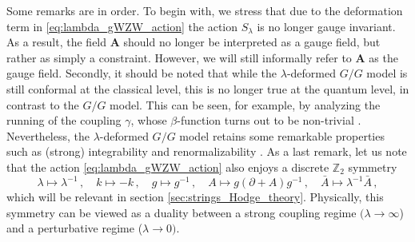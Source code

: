 \documentclass[11pt,a4paper]{article}
\numberwithin{equation}{section}
\numberwithin{table}{section}\setlength{\multlinegap}{25pt}
\begin{document}
Some remarks are in order. To begin with, we stress that due to the deformation term in \eqref{eq:lambda_gWZW_action} the action $S_\lambda$ is no longer gauge invariant. As a result, the field $\mathbf{A}$ should no longer be interpreted as a gauge field, but rather as simply a constraint. However, we will still informally refer to $\mathbf{A}$ as the gauge field. Secondly, it should be noted that while the $\lambda$-deformed $G/G$ model is still conformal at the classical level, this is no longer true at the quantum level, in contrast to the $G/G$ model. This can be seen, for example, by analyzing the running of the coupling $\gamma$, whose $\beta$-function turns out to be non-trivial \cite{Tseytlin:1994,Sfetsos:2014_betafunction,Appadu:2015}. Nevertheless, the $\lambda$-deformed $G/G$ model retains some remarkable properties such as (strong) integrability \cite{Hollowood:2014,Sfetsos:2014_integrability,Georgiou:2019} and renormalizability \cite{Hoare:2019}. As a last remark, let us note that the action \eqref{eq:lambda_gWZW_action} also enjoys a discrete $\mathbb{Z}_2$ symmetry \cite{Kutasov:1989,Itsios:2014,Hoare:2015}
\begin{equation}\label{eq:Z2_symmetry}
	\lambda\mapsto \lambda^{-1}\,,\quad k\mapsto -k\,,\quad g\mapsto g^{-1}\,,\quad A\mapsto g(\partial + A)g^{-1}\,,\quad \bar{A}\mapsto \lambda^{-1}\bar{A}\,,
\end{equation}
which will be relevant in section \ref{sec:strings_Hodge_theory}. Physically, this symmetry can be viewed as a duality between a strong coupling regime $(\lambda\rightarrow \infty$) and a perturbative regime ($\lambda\rightarrow 0)$.
\end{document}
